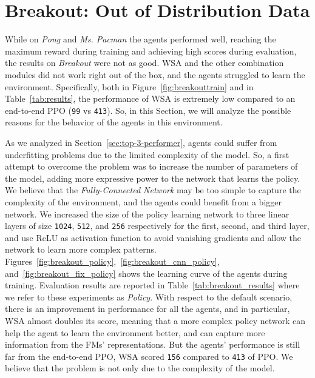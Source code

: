 \section{Breakout: Out of Distribution Data}\label{sec:breakout_study}
While on \textit{Pong} and \textit{Ms. Pacman} the agents performed well, reaching the maximum reward during training and achieving high scores during evaluation, the results on \textit{Breakout} were not as good.
WSA and the other combination modules did not work right out of the box, and the agents struggled to learn the environment.
Specifically, both in Figure~\ref{fig:breakouttrain} and in Table~\ref{tab:results}, the performance of WSA is extremely low compared to an end-to-end PPO (\texttt{99} vs \texttt{413}).
So, in this Section, we will analyze the possible reasons for the behavior of the agents in this environment.

As we analyzed in Section~\ref{sec:top-3-performer}, agents could suffer from underfitting problems due to the limited complexity of the model.
So, a first attempt to overcome the problem was to increase the number of parameters of the model, adding more expressive power to the network that learns the policy.
We believe that the \textit{Fully-Connected Network} may be too simple to capture the complexity of the environment, and the agents could benefit from a bigger network.
We increased the size of the policy learning network to three linear layers of size \texttt{1024}, \texttt{512}, and \texttt{256} respectively for the first, second, and third layer, and use ReLU as activation function to avoid vanishing gradients and allow the network to learn more complex patterns.
Figures~\ref{fig:breakout_policy},~\ref{fig:breakout_cnn_policy}, and~\ref{fig:breakout_fix_policy}
shows the learning curve of the agents during training.
Evaluation results are reported in Table~\ref{tab:breakout_results} where we refer to these experiments as \textit{Policy}.
With respect to the default scenario, there is an improvement in performance for all the agents, and in particular, WSA almost doubles its score, meaning that a more complex policy network can help the agent to learn the environment better, and can capture more information from the FMs' representations.
But the agents' performance is still far from the end-to-end PPO, WSA scored \texttt{156} compared to \texttt{413} of PPO\@.
We believe that the problem is not only due to the complexity of the model.



